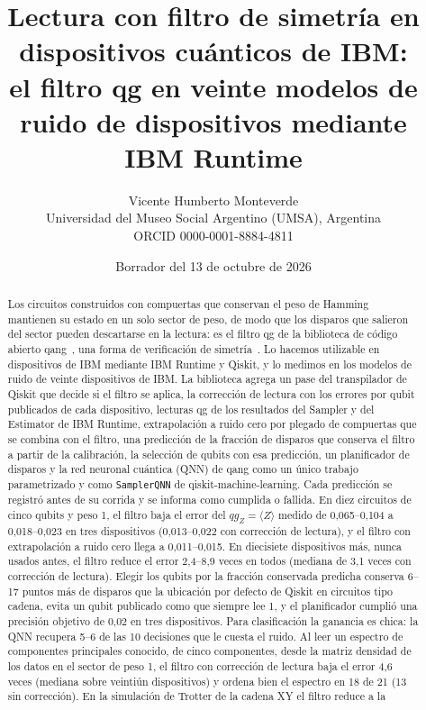 \documentclass[11pt]{article}
\title{Lectura con filtro de simetría en dispositivos cuánticos de IBM:\\
el filtro qg en veinte modelos de ruido de dispositivos mediante IBM Runtime}
\author{Vicente Humberto Monteverde\\
\small Universidad del Museo Social Argentino (UMSA), Argentina\\
\small ORCID 0000-0001-8884-4811}
\date{\small Borrador del 13 de octubre de 2026}
\newcommand{\qZ}{qg_Z}
\begin{document}
\sloppy
\maketitle

\begin{abstract}
Los circuitos construidos con compuertas que conservan el peso de Hamming mantienen su estado en un solo
sector de peso, de modo que los disparos que salieron del sector pueden descartarse en la lectura: es el
filtro qg de la biblioteca de código abierto qang~\cite{monteverde2026qang}, una forma de verificación de
simetría~\cite{bonetmonroig2018,mcardle2019}. Lo hacemos utilizable en dispositivos de IBM mediante IBM
Runtime y Qiskit, y lo medimos en los modelos de ruido de veinte dispositivos de IBM. La biblioteca agrega un
pase del transpilador de Qiskit que decide si el filtro se aplica, la corrección de lectura con los errores
por qubit publicados de cada dispositivo, lecturas qg de los resultados del Sampler y del Estimator de IBM
Runtime, extrapolación a ruido cero por plegado de compuertas que se combina con el filtro, una predicción
de la fracción de disparos que conserva el filtro a partir de la calibración, la selección de qubits con esa
predicción, un planificador de disparos y la red neuronal cuántica (QNN) de qang como un único trabajo
parametrizado y como \texttt{SamplerQNN} de qiskit-machine-learning. Cada predicción se registró antes de su
corrida y se informa como cumplida o fallida. En diez circuitos de cinco qubits y peso 1, el filtro baja el
error del $\qZ=\langle Z\rangle$ medido de 0{,}065--0{,}104 a 0{,}018--0{,}023 en tres dispositivos
(0{,}013--0{,}022 con corrección de lectura), y el filtro con extrapolación a ruido cero llega a
0{,}011--0{,}015. En diecisiete dispositivos más, nunca usados antes, el filtro reduce el error
2{,}4--8{,}9 veces en todos (mediana de 3{,}1 veces con corrección de lectura). Elegir los qubits por la
fracción conservada predicha conserva 6--17 puntos más de disparos que la ubicación por defecto de Qiskit
en circuitos tipo cadena, evita un qubit publicado como que siempre lee 1, y el planificador cumplió una
precisión objetivo de 0{,}02 en tres dispositivos. Para clasificación la ganancia es chica: la QNN recupera
5--6 de las 10 decisiones que le cuesta el ruido. Al leer un espectro de componentes principales
conocido, de cinco componentes, desde la matriz densidad de los datos en el sector de peso 1, el filtro con
corrección de lectura baja el error 4{,}6 veces (mediana sobre veintiún dispositivos) y ordena bien el
espectro en 18 de 21 (13 sin corrección). En la simulación de Trotter de la cadena XY el filtro reduce a la

\end{abstract}
\end{document}
